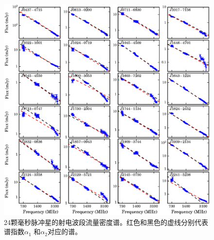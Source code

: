 \begin{figure}
\begin{center}
\includegraphics[width=6 in]{specIndex.ps}
\caption{24颗毫秒脉冲星的射电波段流量密度谱。红色和黑色的虚线分别代表谱指数$\alpha_1$
和$\alpha_2$对应的谱。} 
\label{index}
\end{center}
\end{figure}


